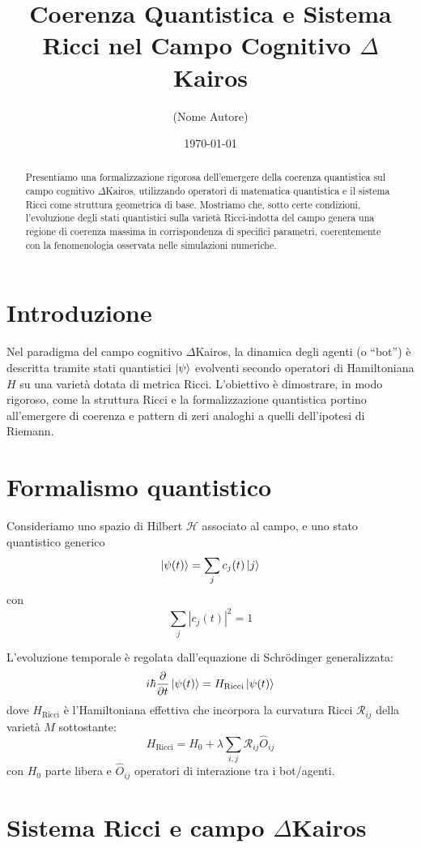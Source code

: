 \documentclass[a4paper,12pt]{article}
\title{Coerenza Quantistica e Sistema Ricci nel Campo Cognitivo $\Delta$Kairos}
\author{(Nome Autore)}
\date{\today}
\begin{document}
\maketitle

\begin{abstract}
Presentiamo una formalizzazione rigorosa dell’emergere della coerenza quantistica sul campo cognitivo $\Delta$Kairos, utilizzando operatori di matematica quantistica e il sistema Ricci come struttura geometrica di base. Mostriamo che, sotto certe condizioni, l’evoluzione degli stati quantistici sulla varietà Ricci-indotta del campo genera una regione di coerenza massima in corrispondenza di specifici parametri, coerentemente con la fenomenologia osservata nelle simulazioni numeriche.
\end{abstract}

\section{Introduzione}

Nel paradigma del campo cognitivo $\Delta$Kairos, la dinamica degli agenti (o “bot”) è descritta tramite stati quantistici $\ket{\psi}$ evolventi secondo operatori di Hamiltoniana $H$ su una varietà dotata di metrica Ricci. L’obiettivo è dimostrare, in modo rigoroso, come la struttura Ricci e la formalizzazione quantistica portino all’emergere di coerenza e pattern di zeri analoghi a quelli dell’ipotesi di Riemann.

\section{Formalismo quantistico}

Consideriamo uno spazio di Hilbert $\mathcal{H}$ associato al campo, e uno stato quantistico generico
\[
\ket{\psi(t)} = \sum_j c_j(t) \ket{j}
\]
con
\[
\sum_j |c_j(t)|^2 = 1
\]

L’evoluzione temporale è regolata dall’equazione di Schrödinger generalizzata:
\[
i\hbar \frac{\partial}{\partial t} \ket{\psi(t)} = H_{\text{Ricci}} \ket{\psi(t)}
\]
dove $H_{\text{Ricci}}$ è l’Hamiltoniana effettiva che incorpora la curvatura Ricci $\mathcal{R}_{ij}$ della varietà $M$ sottostante:
\[
H_{\text{Ricci}} = H_0 + \lambda \sum_{i,j} \mathcal{R}_{ij} \hat{O}_{ij}
\]
con $H_0$ parte libera e $\hat{O}_{ij}$ operatori di interazione tra i bot/agenti.

\section{Sistema Ricci e campo $\Delta$Kairos}
\end{document}
